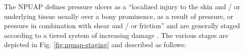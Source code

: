 		The NPUAP defines pressure ulcers as a ``localized injury to the skin and / or underlying tissue usually over a bony prominence, as a result of pressure, or pressure in combination with shear and / or friction'' and are generally staged according to a tiered system of increasing damage \cite{npuap07}. The various stages are depicted in Fig. \ref{fig:npuap-staging} and described as follows:

		\begin{figure}[!t]
			\centering



\end{figure}
